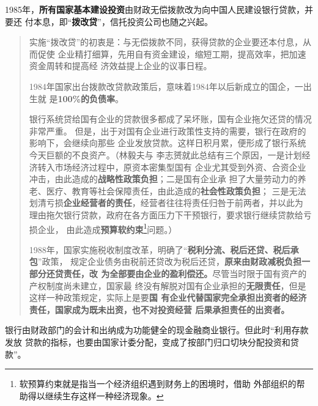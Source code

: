 1985年，\textbf{所有国家基本建设投资}由财政无偿拨款改为向中国人民建设银行贷款，并要还
付本息，即“\textbf{拨改贷}”，信托投资公司也随之兴起。
\begin{quotation}
  实施“拨改贷”的初衷是：与无偿拨款不同，获得贷款的企业要还本付息，从而促使
  企业精打细算，先用自有资金建设，缩短工期，提高效率，把加速资金周转和提高经
  济效益提上企业的议事日程。

  1984年国家出台拨款改贷款政策后，意味着1984年以后新成立的国企，一出生就
  是\textbf{100\%的负债率}。\cite{bogaidaizhaizhuangu}


  银行系统贷给国有企业的贷款很多都成了呆坏账，国有企业拖欠还贷的情况非常严重。
  但是，出于对国有企业进行政策性支持的需要，银行在政府的影响下，会继续向那些
  企业发放贷款。这样日积月累，便形成了银行系统今天巨额的不良资产。（林毅夫与
  李志赟就此总结有三个原因，一是计划经济转入市场经济过程中，原资本密集型国有
  企业尤其受到外资、合资企业冲击，由此造成的\textbf{战略性政策负担}；二是国有企业承
  担了大量劳动力的养老、医疗、教育等社会保障责任，由此造成的\textbf{社会性政策负担}；
  三是无法划清亏损\textbf{企业经营者的责任}，经营者往往将责任归咎于前两者，并以此为
  理由拖欠银行贷款，政府在各方面压力下干预银行，要求银行继续贷款给亏损企业，
  由此造成\textbf{预算软约束}\footnote{软预算约束就是指当一个经济组织遇到财务上的困境时，借助
    外部组织的帮助得以继续生存这样一种经济现象。}问题。）\cite{guoyoujinrong}

  1988年，国家实施税收制度改革，明确了“\textbf{税利分流、税后还贷、税后承包}”政策，
  规定企业债务由税前还贷改为税后还贷，\textbf{原来由财政减税负担一部分还贷责任，改
    为全部要由企业的盈利偿还。}尽管当时限于国有资产的产权制度尚未建立，国家最
  终没有解脱对国有企业承担的\textbf{无限责任}，但是这样一种政策规定，实际上是要\textbf{国
    有企业代替国家完全承担出资者的经济责任，国家成为既未出资，也不对投资经营
    后果承担责任的出资者。}\cite{bogaidai30}
\end{quotation}

银行由财政部门的会计和出纳成为功能健全的现金融商业银行。但此时“利用存款发放
贷款的指标，也要由国家计委分配，变成了按部门归口切块分配投资和贷款”。



